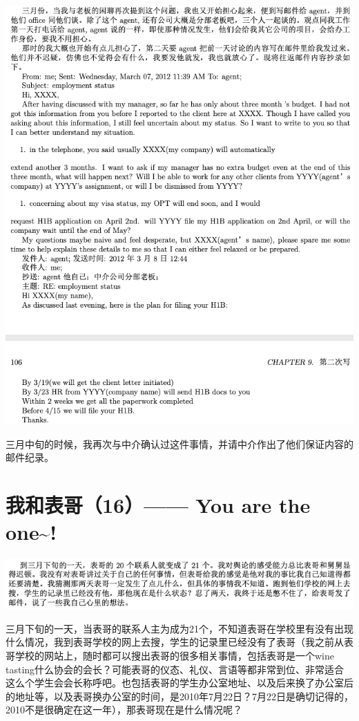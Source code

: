 \documentclass[9pt, b5paper]{article}
\begin{document}
\begin{center}
\includegraphics[width=.9\linewidth]{./pic/p1p105.png}
\end{center}

三月中旬的时候，我再次与中介确认过这件事情，并请中介作出了他们保证内容的邮件纪录。 

\section{我和表哥（16）—— You are the one\textasciitilde{}!}
\label{sec:org9f34917}

\begin{center}
\includegraphics[width=.9\linewidth]{./pic/p1p115-1.png}
\end{center}

三月下旬的一天，当表哥的联系人主为成为21个，不知道表哥在学校里有没有出现什么情况，我到表哥学校的网上去搜，学生的记录里已经没有了表哥（我之前从表哥学校的网站上，随时都可以搜出表哥的很多相关事情，包括表哥是一个wine tasting什么协会的会长？可能表哥的仪态、礼仪、言语等都非常到位、非常适合这么个学生会会长称呼吧。也包括表哥的学生办公室地址、以及后来换了办公室后的地址等，以及表哥换办公室的时间，是2010年7月22日？7月22日是确切记得的，2010不是很确定在这一年），那表哥现在是什么情况呢？
\end{document}
